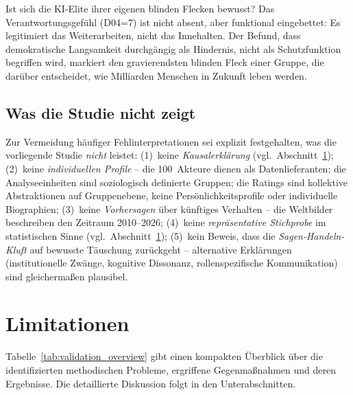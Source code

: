 \documentclass[12pt,a4paper]{article}
\begin{document}
Ist sich die KI-Elite ihrer eigenen blinden Flecken bewusst? Das Verantwortungsgef\"uhl (D04=7) ist nicht absent, aber funktional eingebettet: Es legitimiert das Weiterarbeiten, nicht das Innehalten. Der Befund, dass demokratische Langsamkeit durchg\"angig als Hindernis, nicht als Schutzfunktion begriffen wird, markiert den gravierendsten blinden Fleck einer Gruppe, die dar\"uber entscheidet, wie Milliarden Menschen in Zukunft leben werden.


\subsection{Was die Studie nicht zeigt}
\label{sec:diskussion:negativ}

Zur Vermeidung h\"aufiger Fehlinterpretationen sei explizit festgehalten, was die vorliegende Studie \emph{nicht} leistet: (1)~keine \emph{Kausalerkl\"arung} (vgl.\ Abschnitt~\ref{sec:limitationen}); (2)~keine \emph{individuellen Profile} -- die 100~Akteure dienen als Datenlieferanten; die Analyseeinheiten sind soziologisch definierte Gruppen; die Ratings sind kollektive Abstraktionen auf Gruppenebene, keine Pers\"onlichkeitsprofile oder individuelle Biographien; (3)~keine \emph{Vorhersagen} \"uber k\"unftiges Verhalten -- die Weltbilder beschreiben den Zeitraum 2010--2026; (4)~keine \emph{repr\"asentative Stichprobe} im statistischen Sinne (vgl.\ Abschnitt~\ref{sec:limitationen}); (5)~kein Beweis, dass die \emph{Sagen-Handeln-Kluft} auf bewusste T\"auschung zur\"uckgeht -- alternative Erkl\"arungen (institutionelle Zw\"ange, kognitive Dissonanz, rollenspezifische Kommunikation) sind gleicherma\ss{}en plausibel.


\section{Limitationen}
\label{sec:limitationen}

Tabelle~\ref{tab:validation_overview} gibt einen kompakten \"Uberblick \"uber die identifizierten methodischen Probleme, ergriffene Gegenma\ss{}nahmen und deren Ergebnisse. Die detaillierte Diskussion folgt in den Unterabschnitten.
\end{document}
